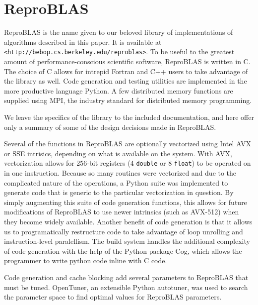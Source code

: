 \section{ReproBLAS}
  \label{sec:reproBLAS}
  ReproBLAS is the name given to our beloved library of implementations of algorithms described in this paper.
  It is available at \texttt{<http://bebop.cs.berkeley.edu/reproblas>}. 
  To be useful to the greatest amount of performance-conscious scientific software, ReproBLAS is written in C.
  The choice of C allows for intrepid Fortran and C++ users to take advantage of the library as well.
  Code generation and testing utilities are implemented in the more productive language Python.
  A few distributed memory functions are supplied using MPI, the industry standard for distributed memory programming.

  We leave the specifics of the library to the included documentation, and here offer only a summary of some of the design decisions made in ReproBLAS.

  Several of the functions in ReproBLAS are optionally vectorized using Intel AVX or SSE intrisics, depending on what is available on the system. With AVX, vectorization allows for 256-bit registers (4 \texttt{double} or 8 \texttt{float}) to be operated on in one instruction. Because so many routines were vectorized and due to the complicated nature of the operations, a Python suite was implemented to generate code that is generic to the particular vectorization in question. By simply augmenting this suite of code generation functions, this allows for future modifications of ReproBLAS to use newer intrinsics (such as AVX-512) when they become widely available. Another benefit of code generation is that it allows us to programatically restructure code to take advantage of loop unrolling and instruction-level paralellism. The build system handles the additional complexity of code generation with the help of the Python package Cog, which allows the programmer to write python code inline with C code.

  Code generation and cache blocking add several parameters to ReproBLAS that must be tuned. OpenTuner, an extensible Python autotuner, was used to search the parameter space to find optimal values for ReproBLAS parameters.

